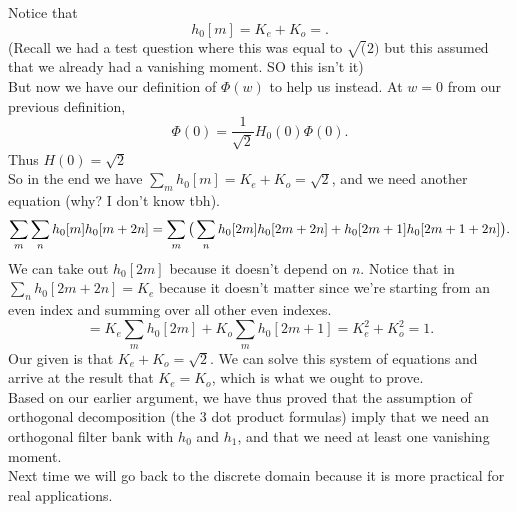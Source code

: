 Notice that  \[
	h_0[m]=K_e+K_o=
.\] 
(Recall we had a test question where this was equal to $\sqrt(2)$ but this assumed that we already had a vanishing moment. SO this isn't it)\\
But now we have our definition of $\Phi(w)$ to help us instead. At $w=0$ from our previous definition,
 \[
	 \Phi(0)=\frac{1}{\sqrt{2}}H_0(0)\Phi(0)
.\] Thus $H(0)=\sqrt{2}$ \\
So in the end we have $\sum_{m}h_0[m]=K_e+K_o=\sqrt{2}$, and we need another equation (why? I don't know tbh).\\
\[
	\sum_{m}\sum_{n}h_0[m]h_0[m+2n]\\
	=\sum_{m}\big(\sum_{n}h_0[2m]h_0[2m+2n]+h_0[2m+1]h_0[2m+1+2n]\big)\\

.\] 
We can take out $h_0[2m]$ because it doesn't depend on  $n$.
Notice that in  $\sum_{n}h_0[2m+2n]=K_e$ because it doesn't matter since we're starting from an even index and summing over all other even indexes.\\
\[
	=K_e\sum_{m}h_0[2m]+K_o\sum_{m}h_0[2m+1]
	=K_e^2+K_o^2=1
.\] 
Our given is that $K_e+K_o=\sqrt{2}$.
We can solve this system of equations and arrive at the result that $K_e=K_o$, which is what we ought to prove.\\
Based on our earlier argument, we have thus proved that the assumption of orthogonal decomposition  (the 3 dot product formulas) imply that we need an orthogonal filter bank with $h_0$ and  $h_1$, and that we need at least one vanishing moment.\\
Next time we will go back to the discrete domain because it is more practical for real applications.


